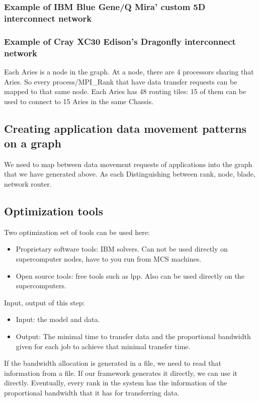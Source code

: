 \documentclass[letter]{article}
\begin{document}
\subsubsection{Example of IBM Blue Gene/Q Mira' custom 5D interconnect network}

\subsubsection{Example of Cray XC30 Edison's Dragonfly interconnect network}

Each Aries is a node in the graph. At a node, there are 4 processors sharing that Aries. So every process/MPI\_Rank that have data transfer requests can be mapped to that same node. Each Aries has 48 routing tiles: 15 of them can be used to connect to 15 Aries in the same Chassis.

\subsection{Creating application data movement patterns on a graph}
We need to map between data movement requests of applications into the graph that we have generated above. As each 
Distinguishing between rank, node, blade, network router.

\subsection {Optimization tools}
Two optimization set of tools can be used here:
\begin{itemize}
\item Proprietary software tools: IBM solvers. Can not be used directly on supercomputer nodes, have to you run from MCS machines.
\item Open source tools: free tools such as lpp. Also can be used directly on the supercomputers.
\end{itemize}

Input, output of this step:
\begin{itemize}
\item Input: the model and data.
\item Output: The minimal time to transfer data and the proportional bandwidth given for each job to achieve that minimal transfer time.
\end{itemize}

If the bandwidth allocation is generated in a file, we need to read that information from a file. If our framework generates it directly, we can use it directly. Eventually, every rank in the system has the information of the proportional bandwidth that it has for transferring data.
\end{document}
